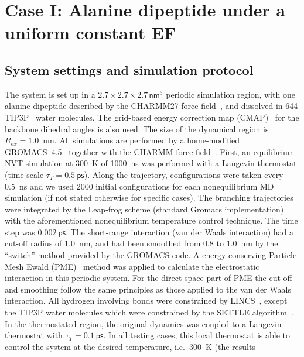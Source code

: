 \documentclass[journal=jctcce,manuscript=manuscript]{achemso}
\newcommand{\vect}[1]{\textbf{\textit{#1}}}
\begin{document}
\section{Case I: Alanine dipeptide
  under a uniform  constant EF}

\subsection{System settings and simulation protocol}
The system is set up in a $2.7\times 2.7\times
2.7\, \textsf{nm}^3$ periodic simulation region, with one alanine dipeptide
described by the CHARMM27 force field~\cite{foloppe2000all}, and dissolved in 644 TIP3P~\cite{jorgensen1983comparison}
water molecules. The grid-based energy correction map (CMAP)~\cite{mackerell2004extending}
for the backbone dihedral angles is also used.
The size of the  dynamical region is $R_{ex} = 1.0$~nm.
All simulations are performed by a home-modified GROMACS~4.5~\cite{pronk2013gromacs} together with the CHARMM
force field~\cite{bjelkmar2010implementation}.
First, an equilibrium NVT simulation at 300~K of
1000~\textsf{ns} was performed with a Langevin thermostat (time-scale
$\tau_T = 0.5~\textsf{ps}$).  Along the trajectory, configurations were taken every
0.5~\textsf{ns} and we used 2000 initial configurations for each nonequilibrium
MD simulation (if not stated otherwise for specific cases).
The branching trajectories were integrated by the
Leap-frog scheme (standard Gromacs implementation) with the aforementioned nonequilibrium
temperature control technique.  The
time step was $0.002~\textsf{ps}$.
The short-range
interaction (van der Waals interaction)
had a cut-off radius of 1.0~nm, and had been smoothed from $0.8$ to $1.0$~nm by the
``switch'' method provided by the GROMACS code.
A energy conserving Particle Mesh Ewald (PME)~\cite{darden1993pme, essmann1995spm}
method was applied to calculate the electrostatic interaction in this
periodic system. For the direct space part of PME the cut-off and smoothing follow the same principles as those applied to the van der Waals interaction.
All hydrogen involving bonds were constrained by LINCS~\cite{hess1997lincs}, except 
the TIP3P water molecules which were constrained by the SETTLE algorithm~\cite{miyamoto2004settle}.
In the thermostated region, the original dynamics was
coupled to a Langevin thermostat with $\tau_T = 0.1~\textsf{ps}$.
In all testing cases, this local thermostat is able to control
the system at the desired temperature, i.e.~300~K (the results
\end{document}
